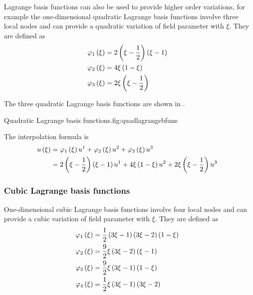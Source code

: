Lagrange basis functions can also be used to provide higher order variations,
for example the one-dimensional quadratic Lagrange basis functions involve
three local nodes and can provide a quadratic variation of field parameter
with $\xi$. They are defined as
\begin{equation}
  \begin{split}
       \varphi_{1} \left( \xi \right)  &=2\left( \xi-\frac12 \right)\left( \xi-1 \right) \\
       \varphi_{2} \left( \xi \right)  &=4\xi\left( 1-\xi \right) \\
       \varphi_{3} \left( \xi \right)  &=2\xi\left( \xi-\frac12 \right)
  \end{split}
  \label{eqn:quadraticlbfuns}
\end{equation}

The three \onedal quadratic Lagrange basis functions are shown in .

{Quadratic Lagrange basis functions.}{fig:quadlagrangebfuns}

The interpolation formula is
\begin{equation}
  \begin{split}
     u\left( \xi \right) &=   \varphi_{1} \left( \xi \right)   {u}^{1} +   \varphi_{2} \left( \xi \right)   {u}^{2} +
       \varphi_{3} \left( \xi \right)   {u}^{3} \\
    &=2\left( \xi-\frac12 \right)\left( \xi-1 \right) {u}^{1} +
    4\xi\left( 1-\xi \right) {u}^{2} +2\xi\left( \xi-\frac12 \right) {u}^{3} 
  \end{split}
\end{equation}

\subsubsection{Cubic Lagrange basis functions}

One-dimensional cubic Lagrange basis functions involve
four local nodes and can provide a cubic variation of field parameter
with $\xi$. They are defined as
\begin{equation}
  \begin{split}
       \varphi_{1} \left( \xi \right)  &=\frac12\left( 3\xi-1 \right)\left( 3\xi-2 \right)\left( 1-\xi \right) \\
       \varphi_{2} \left( \xi \right)  &=\frac92\xi\left( 3\xi-2 \right)\left( \xi-1 \right) \\
       \varphi_{3} \left( \xi \right)  &=\frac92\xi\left( 3\xi-1 \right)\left( 1-\xi \right) \\
       \varphi_{4} \left( \xi \right)  &=\frac12\xi\left( 3\xi-1 \right)\left( 3\xi-2 \right)
  \end{split}
  \label{eqn:cubiclbfuns}
\end{equation}

